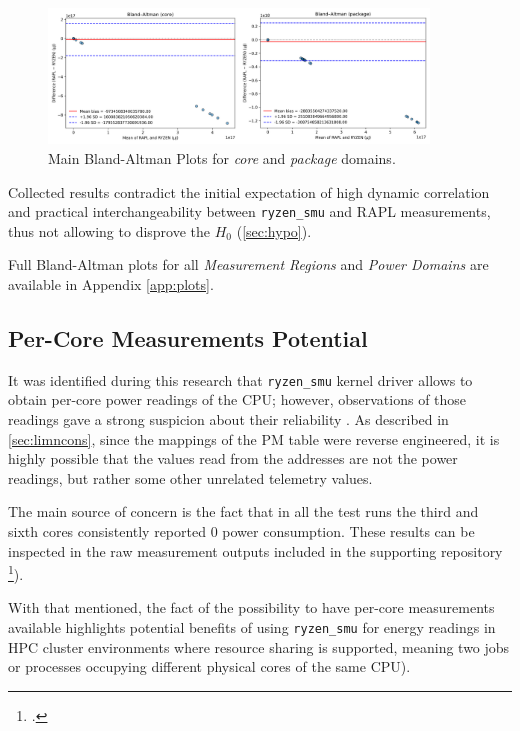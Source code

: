 \begin{figure}[htbp]
    \centering
    \includegraphics[width=0.9\textwidth]{assets/bland_altman}
    \caption{Main Bland-Altman Plots for \emph{core} and \emph{package} domains.}
    \label{fig:plots}
\end{figure}

Collected results contradict the initial expectation of high dynamic
correlation and practical interchangeability between \texttt{ryzen\_smu} and
\gls{RAPL} measurements, thus not allowing to disprove the $H_{0}$
(\cref{sec:hypo}).

Full Bland-Altman plots for all \emph{Measurement Regions} and \emph{Power Domains}
are available in Appendix \cref{app:plots}.

\subsection{Per-Core Measurements Potential}

It was identified during this research that \texttt{ryzen\_smu} kernel driver
allows to obtain per-core power readings of the \gls{CPU}; however,
observations of those readings gave a strong suspicion about their reliability
. As described in \cref{sec:limncons}, since the mappings of the \gls{PM}
table were reverse engineered, it is highly possible that the values read
from the addresses are not the power readings, but rather some other unrelated
telemetry values.

The main source of concern is the fact that in all the test runs the third
and sixth cores consistently reported 0 power consumption. These results can
be inspected in the raw measurement outputs included in the supporting
repository \footcite{yahdzhyiev2025repo}).

With that mentioned, the fact of the possibility to have per-core measurements
available highlights potential benefits of using \texttt{ryzen\_smu} for
energy readings in \gls{HPC} cluster environments where resource sharing is
supported, meaning two jobs or processes occupying different physical cores
of the same \gls{CPU}).

